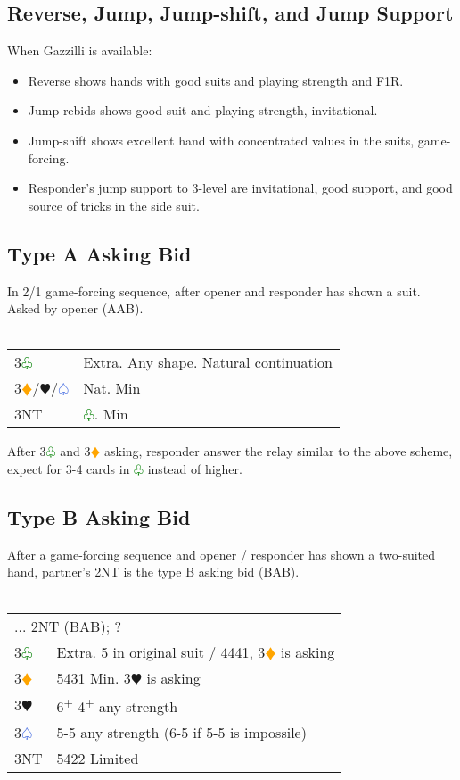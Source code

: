 \documentclass{article}
\renewcommand{\sp}{\textcolor{RoyalBlue}{$\varspade$}}
\newcommand{\he}{\textcolor{RubineRed}{$\varheart$}}
\newcommand{\di}{\textcolor{Orange}{$\vardiamond$}}
\newcommand{\cl}{\textcolor{Green}{$\varclub$}}
\newcommand{\nt}{\relsize{-1}NT\relsize{1}}
\newcommand{\up}{\textsuperscript{+}}
\begin{document}
\subsection{Reverse, Jump, Jump-shift, and Jump Support}
When Gazzilli is available: 
\begin{itemize}
    \itemsep0em
    \item Reverse shows hands with good suits and playing strength and F1R.
    \item Jump rebids shows good suit and playing strength, invitational.
    \item Jump-shift shows excellent hand with concentrated values in the suits, game-forcing.
    \item Responder's jump support to 3-level are invitational, good support, and good source of tricks in the side suit.
\end{itemize}

\subsection{Type A Asking Bid}
In 2/1 game-forcing sequence, after opener and responder has shown a suit. Asked by opener (AAB). \\\\
\begin{tabular}{|l|p{6.5cm}}
	3\cl{} & Extra. Any shape. Natural continuation \\
	3\di{}/\he{}/\sp{} & Nat. Min \\
	3\nt{} & \cl{}. Min \\
\end{tabular}

\medskip

After 3\cl{} and 3\di{} asking, responder answer the relay similar to the above scheme, expect for 3-4 cards in \cl{} instead of higher.

\subsection{Type B Asking Bid}
After a game-forcing sequence and opener / responder has shown a two-suited hand, partner's 2\nt{} is the type B asking bid (BAB). \\\\
\begin{tabular}{|l|p{6.5cm}}
	\multicolumn{2}{l}{... 2\nt{} (BAB); ? } \\
    3\cl{} & Extra. 5 in original suit / 4441, 3\di{} is asking \\
    3\di{} & 5431 Min. 3\he{} is asking \\
    3\he{}& 6\up{}-4\up{} any strength \\
    3\sp{} & 5-5 any strength (6-5 if 5-5 is impossile) \\
    3\nt & 5422 Limited
\end{tabular}
\end{document}
